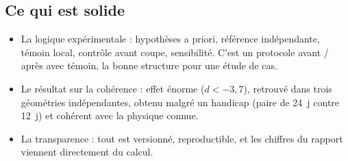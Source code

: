 \documentclass[11pt,a4paper]{article}
\begin{document}
\subsection{Ce qui est solide}
\begin{itemize}
\item La logique expérimentale : hypothèses a priori, référence indépendante, témoin local, contrôle avant coupe,
  sensibilité. C'est un protocole avant / après avec témoin, la bonne structure pour une étude de cas.
\item Le résultat sur la cohérence : effet énorme ($d<-3{,}7$), retrouvé dans trois géométries indépendantes,
  obtenu malgré un handicap (paire de 24~j contre 12~j) et cohérent avec la physique connue.
\item La transparence : tout est versionné, reproductible, et les chiffres du rapport viennent directement du calcul.
\end{itemize}
\end{document}
